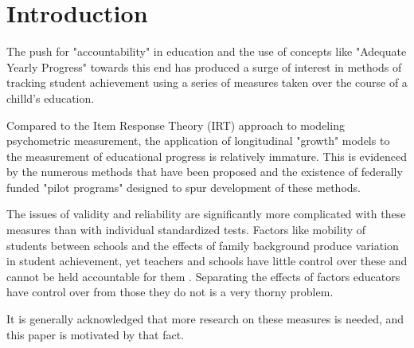 \documentclass[reqno,12pt]{amsart}
\theoremstyle{plain}
\numberwithin{equation}{section} %
\numberwithin{figure}{section} %
\theoremstyle{remark}
\begin{document}
\section{Introduction}
The push for "accountability" in education and the use of concepts like "Adequate Yearly Progress" towards this end has produced a surge of interest in methods of tracking student achievement using a series of measures taken over the course of a chilld's education.
\par\vspace{0.3 cm}
Compared to the Item Response Theory (IRT) approach to modeling psychometric measurement, the application of longitudinal "growth" models to the measurement of educational progress is relatively immature.  This is evidenced by the numerous methods that have been proposed and the existence of federally funded "pilot programs" designed to spur development of these methods.  
\par\vspace{0.3 cm}
The issues of validity and reliability are significantly more complicated with these measures than with individual standardized tests.  Factors like mobility of students between schools and the effects of family background produce variation in student achievement, yet teachers and schools have little control over these and cannot be held accountable for them \cite{ccsso1}.  Separating the effects of factors educators have control over from those they do not is a very thorny problem.     
\par\vspace{0.3 cm}
It is generally acknowledged that more research on these measures is needed, and this paper is motivated by that fact.
\end{document}
